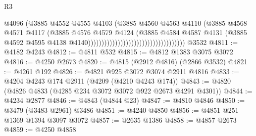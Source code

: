 \begin{lexlean}{R3}
\begin{coremodule}
                                                                @4096
                                                                (@3885
                                                                  @4552
                                                                  @4555
                                                                  @4103
                                                                  (@3885
                                                                    @4560
                                                                    @4563
                                                                    @4110
                                                                    (@3885
                                                                      @4568
                                                                      @4571
                                                                      @4117
                                                                      (@3885
                                                                        @4576
                                                                        @4579
                                                                        @4124
                                                                        (@3885
                                                                          @4584
                                                                          @4587
                                                                          @4131
                                                                          (@3885
                                                                            @4592
                                                                            @4595
                                                                            @4138
                                                                            @4140))))))))))))))))))))))))))))))))))))
    @3532
@4811 := @4182 @4243
@4812 := @4811 @532
@4815 := @4812 @1383 @3075 @3072
@4816 := @4250 @2673
@4820 := @4815 (@2912 @4816) (@2866 @3532)
@4821 := @4261 @192
@4826 := @4821 @925 @3072 @3074 @2911 @4816
@4833 := @4204 @4243 @174 @2911 (@4209 (@4210 @4243 @174))
@4843 := @4820 (@4826 @4833 (@4285 @234 @3072 @3072 @922 @2673 @4291 @4301))
@4844 := @4234 @2877
@4846 := @4843 (@4844 @23)
@4847 := @4810 @4846
@4850 := @3479 (@3483 @2961) @3486
@4851 := @4240 @4850
@4856 := @4851 @251 @1369 @1394 @3097 @3072
@4857 := @2635 @1386
@4858 := @4857 @2673
@4859 := @4250 @4858

\end{coremodule}
\end{lexlean}
